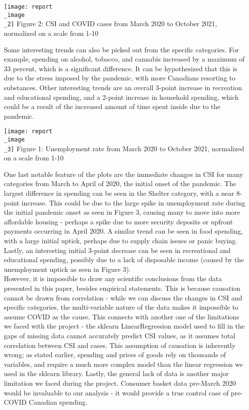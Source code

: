 \documentclass[fontsize=11pt]{article}
\begin{document}
\begin{center}
\texttt{[image: report\\\_image\\\_2]}
Figure 2: CSI and COVID cases from March 2020 to October 2021, normalized on a scale from 1-10
\end{center}

\tab Some interesting trends can also be picked out from the specific categories. For example, spending on alcohol, tobacco, and cannabis increased by a maximum of 33 percent, which is a significant difference. It can be hypothesized that this is due to the stress imposed by the pandemic, with more Canadians resorting to substances. Other interesting trends are an overall 3-point increase in recreation and educational spending, and a 2-point increase in household spending, which could be a result of the increased amount of time spent inside due to the pandemic.\\

\begin{center}
\texttt{[image: report\\\_image\\\_3]}
Figure 1: Unemployment rate from March 2020 to October 2021, normalized on a scale from 1-10
\end{center}

\tab One last notable feature of the plots are the immediate changes in CSI for many categories from March to April of 2020, the initial onset of the pandemic. The largest difference in spending can be seen in the Shelter category, with a near 8-point increase. This could be due to the large spike in unemployment rate during the initial pandemic onset as seen in Figure 3, causing many to move into more affordable housing - perhaps a spike due to more security deposits or upfront payments occurring in April 2020. A similar trend can be seen in food spending, with a large initial uptick, perhaps due to supply chain issues or panic buying. Lastly, an interesting initial 3-point decrease can be seen in recreational and educational spending, possibly due to a lack of disposable income (caused by the unemployment uptick as seen in Figure 3).\\

\tab However, it is impossible to draw any scientific conclusions from the data presented in this paper, besides empirical statements. This is because causation cannot be drawn from correlation - while we can discuss the changes in CSI and specific categories, the multi-variable nature of the data makes it impossible to assume COVID as the cause. This connects with another one of the limitations we faced with the project - the sklearn LinearRegression model used to fill in the gaps of missing data cannot accurately predict CSI values, as it assumes total correlation between CSI and cases. This assumption of causation is inherently wrong; as stated earlier, spending and prices of goods rely on thousands of variables, and require a much more complex model than the linear regression we used in the sklearn library. Lastly, the general lack of data is another major limitation we faced during the project. Consumer basket data pre-March 2020 would be invaluable to our analysis - it would provide a true control case of pre-COVID Canadian spending.\\
\end{document}

